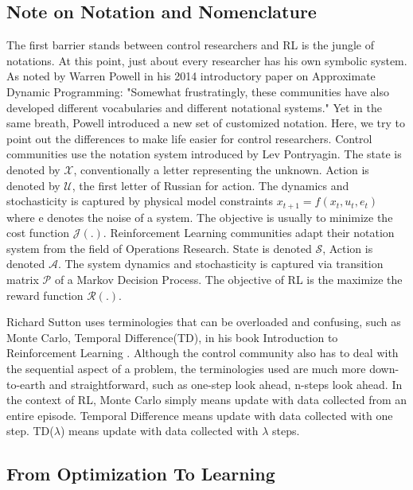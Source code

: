 \documentclass[journal]{IEEEtran}
\begin{document}
\subsection{Note on Notation and Nomenclature}
The first barrier stands between control researchers and RL is the jungle of notations. At this point, just about every researcher has his own symbolic system. As noted by Warren Powell in his 2014 introductory paper on Approximate Dynamic Programming: "Somewhat frustratingly, these communities have also developed different vocabularies and different notational systems." Yet in the same breath, Powell introduced a new set of customized notation. \cite{Powell2009WhatYS} Here, we try to point out the differences to make life easier for control researchers. Control communities use the notation system introduced by Lev Pontryagin. The state is denoted by $ \mathcal{X}$, conventionally a letter representing the unknown. Action is denoted by $\mathcal{U}$, the first letter of Russian for action. The dynamics and stochasticity is captured by physical model constraints $x_{t+1}=f(x_t,u_t,e_t)$ where e denotes the noise of a system. The objective is usually to minimize the cost function $\mathcal{J(.)}$. Reinforcement Learning communities adapt their notation system from the field of Operations Research. State is denoted $\mathcal{S}$, Action is denoted $\mathcal{A}$. The system dynamics and stochasticity is captured via transition matrix $\mathcal{P}$ of a Markov Decision Process. The objective of RL is the maximize the reward function $\mathcal{R(.)}$. 

Richard Sutton uses terminologies that can be overloaded and confusing, such as Monte Carlo, Temporal Difference(TD), in his book Introduction to Reinforcement Learning \cite{Sutton1998IntroductionTR}. Although the control community also has to deal with the sequential aspect of a problem, the terminologies used are much more down-to-earth and straightforward, such as one-step look ahead, n-steps look ahead. In the context of RL, Monte Carlo simply means update with data collected from an entire episode. Temporal Difference means update with data collected with one step. TD($\lambda$) means update with data collected with $\lambda$ steps. 

\subsection{From Optimization To Learning}
\end{document}
